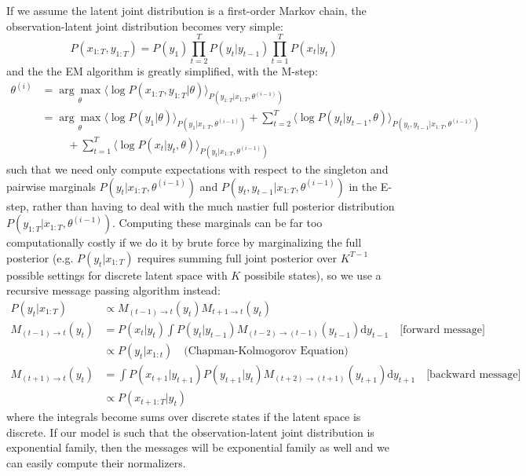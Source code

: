 \documentclass[a4paper]{article}
\begin{document}
If we assume the latent joint distribution is a first-order Markov chain, the observation-latent joint distribution becomes very simple:
\[ P(x_{1:T},y_{1:T}) = P(y_1)\prod_{t=2}^T P(y_t|y_{t-1}) \prod_{t=1}^T P(x_t|y_t) \]
and the the EM algorithm is greatly simplified, with the M-step:
\begin{align*}
\theta^{(i)} &= \underset{\theta}{\arg\max} \langle\log P(x_{1:T},y_{1:T}|\theta)\rangle_{P(y_{1:T}|x_{1:T},\theta^{(i-1)})} \\
&= \underset{\theta}{\arg\max} \langle\log P(y_1|\theta)\rangle_{P(y_1|x_{1:T},\theta^{(i-1)})} + \sum_{t=2}^T \langle\log P(y_t|y_{t-1},\theta)\rangle_{P(y_t,y_{t-1}|x_{1:T},\theta^{(i-1)})} \\
& \phantom{{}=15} + \sum_{t=1}^T \langle\log P(x_t|y_t,\theta)\rangle_{P(y_t|x_{1:T},\theta^{(i-1)})}
\end{align*}
such that we need only compute expectations with respect to the singleton and pairwise marginals $P(y_t|x_{1:T},\theta^{(i-1)})$ and $P(y_t,y_{t-1}|x_{1:T},\theta^{(i-1)})$ in the E-step, rather than having to deal with the much nastier full posterior distribution $P(y_{1:T}|x_{1:T},\theta^{(i-1)})$. Computing these marginals can be far too computationally costly if we do it by brute force by marginalizing the full posterior (e.g. $P(y_t|x_{1:T})$ requires summing full joint posterior over $K^{T-1}$ possible settings for discrete latent space with $K$ possibile states), so we use a recursive message passing algorithm instead:
\begin{align*}
P(y_t|x_{1:T}) &\propto M_{(t-1)\rightarrow t}(y_t)M_{t+1\rightarrow t}(y_t) \\
M_{(t-1)\rightarrow t}(y_t) &= P(x_t|y_t) \int P(y_t|y_{t-1}) M_{(t-2)\rightarrow (t-1)}(y_{t-1}) \textrm{d}y_{t-1} \quad\text{[forward message]} \\
&\propto P(y_t|x_{1:t}) \quad \text{(Chapman-Kolmogorov Equation)} \\
M_{(t+1)\rightarrow t}(y_t) &= \int P(x_{t+1}|y_{t+1}) P(y_{t+1}|y_t) M_{(t+2)\rightarrow (t+1)}(y_{t+1}) \textrm{d}y_{t+1} \quad\text{[backward message]} \\
&\propto P(x_{t+1:T}|y_t)
\end{align*}
where the integrals become sums over discrete states if the latent space is discrete. If our model is such that the observation-latent joint distribution is exponential family, then the messages will be exponential family as well and we can easily compute their normalizers.
\end{document}
